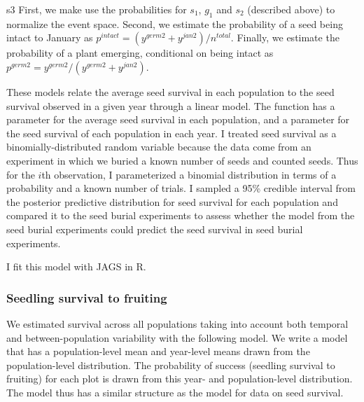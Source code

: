 \documentclass[12pt, oneside, titlepage]{article}   	%
\begin{document}
s3  First, we make use the probabilities for $s_1$, $g_1$ and $s_2$ (described above) to normalize the event space. Second, we estimate the probability of a seed being intact to January as $p^{intact} = (y^{germ2}+y^{jan2})/n^{total}$. Finally, we estimate the probability of a plant emerging, conditional on being intact as $p^{germ2} = y^{germ2}/(y^{germ2}+y^{jan2})$. 

These models relate the average seed survival in each population to the seed survival observed in a given year through a linear model. The function has a parameter for the average seed survival in each population, and a parameter for the seed survival of each population in each year. I treated seed survival as a binomially-distributed random variable because the data come from an experiment in which we buried a known number of seeds and counted seeds. Thus for the $i$th observation, I parameterized a binomial distribution in terms of a probability and a known number of trials. I sampled a 95\% credible interval from the posterior predictive distribution for seed survival for each population and compared it to the seed burial experiments to assess whether the model from the seed burial experiments could predict the seed survival in seed burial experiments. 

I fit this model with JAGS in R. %
\fi

\subsubsection*{Seedling survival to fruiting}

We estimated survival across all populations taking into account both temporal and between-population variability with the following model. We write a model that has a population-level mean and year-level means drawn from the population-level distribution. The probability of success (seedling survival to fruiting) for each plot is drawn from this year- and population-level distribution. The model thus has a similar structure as the model for data on seed survival.
\end{document}
